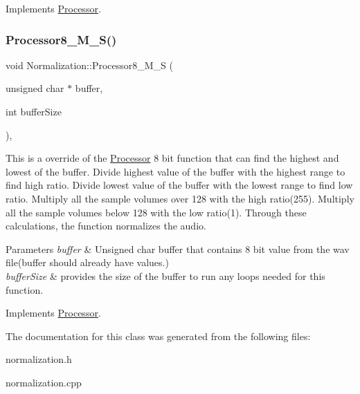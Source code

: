 Implements \hyperlink{classProcessor_a2a0903d1ca9e627e8a45e5159ecc0505}{Processor}.

\mbox{\label{classNormalization_ab1303e7cd41e3ec49edafd7b83cb5480}} 
\subsubsection{\texorpdfstring{Processor8\+\_\+\+M\+\_\+\+S()}{Processor8\_M\_S()}}
{\footnotesize\ttfamily void Normalization\+::\+Processor8\+\_\+\+M\+\_\+S (\begin{DoxyParamCaption}\item[{unsigned char $\ast$}]{buffer,  }\item[{int}]{buffer\+Size }\end{DoxyParamCaption})\hspace{0.3cm}{\ttfamily [override]}, {\ttfamily [virtual]}}



This is a override of the \hyperlink{classProcessor}{Processor} 8 bit function that can find the highest and lowest of the buffer. Divide highest value of the buffer with the highest range to find high ratio. Divide lowest value of the buffer with the lowest range to find low ratio. Multiply all the sample volumes over 128 with the high ratio(255). Multiply all the sample volumes below 128 with the low ratio(1). Through these calculations, the function normalizes the audio. 


\begin{DoxyParams}{Parameters}
{\em buffer} & Unsigned char buffer that contains 8 bit value from the wav file(buffer should already have values.) \\
\hline
{\em buffer\+Size} & provides the size of the buffer to run any loops needed for this function. \\
\hline
\end{DoxyParams}


Implements \hyperlink{classProcessor_a5a977cc3596fdeac860d5e28a99806a1}{Processor}.



The documentation for this class was generated from the following files\+:\begin{DoxyCompactItemize}
\item 
normalization.\+h\item 
normalization.\+cpp\end{DoxyCompactItemize}
